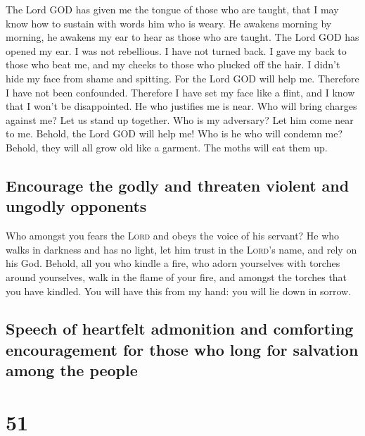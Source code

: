  The Lord GOD has given me the tongue of those who are
taught, that I may know how to sustain with words him who is weary. He
awakens morning by morning, he awakens my ear to hear as those who are
taught.  The Lord GOD has opened my ear. I was not
rebellious. I have not turned back.  I gave my back to
those who beat me, and my cheeks to those who plucked off the hair. I
didn't hide my face from shame and spitting.  For the Lord
GOD will help me. Therefore I have not been confounded. Therefore I have
set my face like a flint, and I know that I won't be disappointed.
 He who justifies me is near. Who will bring charges
against me? Let us stand up together. Who is my adversary? Let him come
near to me.  Behold, the Lord GOD will help me! Who is he
who will condemn me? Behold, they will all grow old like a garment. The
moths will eat them up.

\hypertarget{encourage-the-godly-and-threaten-violent-and-ungodly-opponents}{%
\subsection{Encourage the godly and threaten violent and ungodly
opponents}\label{encourage-the-godly-and-threaten-violent-and-ungodly-opponents}}

 Who amongst you fears the \textsc{Lord} and obeys the
voice of his servant? He who walks in darkness and has no light, let him
trust in the \textsc{Lord}'s name, and rely on his God. 
Behold, all you who kindle a fire, who adorn yourselves with torches
around yourselves, walk in the flame of your fire, and amongst the
torches that you have kindled. You will have this from my hand: you will
lie down in sorrow.

\hypertarget{speech-of-heartfelt-admonition-and-comforting-encouragement-for-those-who-long-for-salvation-among-the-people}{%
\subsection{Speech of heartfelt admonition and comforting encouragement
for those who long for salvation among the
people}\label{speech-of-heartfelt-admonition-and-comforting-encouragement-for-those-who-long-for-salvation-among-the-people}}

\hypertarget{section-50}{%
\section{51}\label{section-50}}

